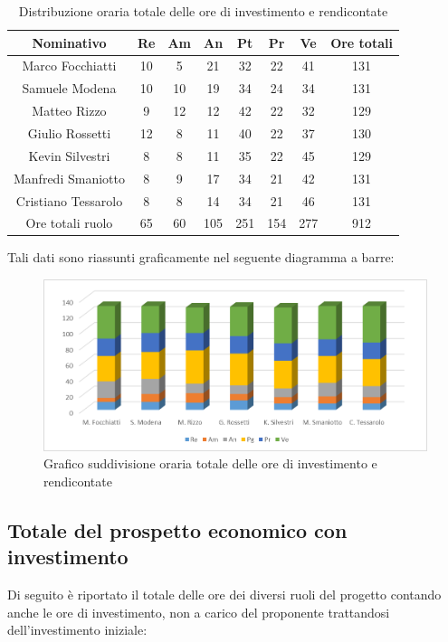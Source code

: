 \documentclass[./PianodiProgetto.tex]{subfiles}
\begin{document}
\begin{table}[H]
	\centering
	\begin{tabular}{|c|cccccc|c|}
		\hline
		Nominativo&Re&Am&An&Pt&Pr&Ve&Ore totali\\ \hline
		Marco Focchiatti&10&5&21&32&22&41&131 \\ \hline
		Samuele Modena&10&10&19&34&24&34&131 \\ \hline
		Matteo Rizzo&9&12&12&42&22&32&129 \\ \hline
		Giulio Rossetti&12&8&11&40&22&37&130 \\ \hline
		Kevin Silvestri&8&8&11&35&22&45&129 \\ \hline
		Manfredi Smaniotto&8&9&17&34&21&42&131 \\ \hline
		Cristiano Tessarolo&8&8&14&34&21&46&131 \\  \hline
		Ore totali ruolo&65&60&105&251&154&277&912 \\ \hline
	\end{tabular}
	\caption{Distribuzione oraria totale delle ore di investimento e rendicontate}
\end{table}

Tali dati sono riassunti graficamente nel seguente diagramma a barre:
\begin{figure}[H]
	\centering
	\includegraphics[width=1\linewidth]{img/grafici/OreInvestimentoRendicontateProspettoOrario}
	\caption{Grafico suddivisione oraria totale delle ore di investimento e rendicontate}
	\label{fig:ore-investimento-rendicontate-prospetto-orario}
\end{figure}

\subsection{Totale del prospetto economico con investimento}
Di seguito è riportato il totale delle ore dei diversi ruoli del progetto contando anche le ore di investimento, non a carico del proponente trattandosi dell'investimento iniziale:
\end{document}
